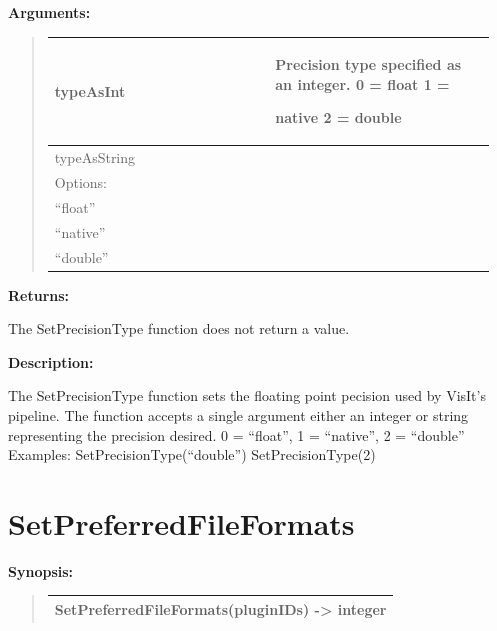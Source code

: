 \documentclass[letterpaper,10pt,english]{sphinxmanual}
\begin{document}
\begin{DUlineblock}{0em}
\item[] 
\item[] \textbf{Arguments:}
\end{DUlineblock}
\begin{quote}

\begin{tabular}{|p{0.475\linewidth}|p{0.475\linewidth}|}
\hline

typeAsInt
 & 
\begin{DUlineblock}{0em}
\item[] Precision type specified as an integer. 0 = float 1 =
\item[] native 2 = double
\end{DUlineblock}
\\
\hline
typeAsString
 & \\
\hline
Options:
 & \\
\hline
``float''
 & \\
\hline
``native''
 & \\
\hline
``double''
 & \\
\hline\end{tabular}

\end{quote}

\begin{DUlineblock}{0em}
\item[] 
\item[] \textbf{Returns:}
\item[] The SetPrecisionType function does not return a value.
\item[] 
\item[] \textbf{Description:}
\item[] The SetPrecisionType function sets the floating point pecision
used by VisIt's pipeline.  The function accepts a single argument
either an integer or string representing the precision desired.
0 = ``float'', 1 = ``native'', 2 = ``double''
Examples:
SetPrecisionType(``double'')
SetPrecisionType(2)
\end{DUlineblock}

\begin{DUlineblock}{0em}
\item[] 
\end{DUlineblock}


\section{SetPreferredFileFormats}
\label{functions:setpreferredfileformats}
\begin{DUlineblock}{0em}
\item[] \textbf{Synopsis:}
\end{DUlineblock}
\begin{quote}

\begin{tabulary}{\linewidth}{|L|}
\hline

SetPreferredFileFormats(pluginIDs) -\textgreater{} integer
\\
\hline\end{tabulary}

\end{quote}
\end{document}
